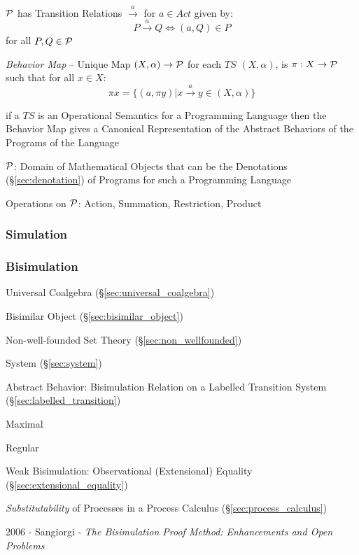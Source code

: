 $\mathcal{P}$ has Transition Relations $\xrightarrow{a}$ for $a \in Act$
given by:
\[
  P \xrightarrow{a} Q \Leftrightarrow (a,Q) \in P
\]
for all $P,Q \in \mathcal{P}$

\emph{Behavior Map} -- Unique Map $(X,\alpha) \rightarrow \mathcal{P}$
for each $TS$ $(X,\alpha)$, is $\pi : X \rightarrow \mathcal{P}$ such
that for all $x \in X$:
\[
  \pi x = \{(a,\pi y) | x \xrightarrow{a} y \in (X,\alpha)\}
\]

if a $TS$ is an Operational Semantics for a Programming Language then
the Behavior Map gives a Canonical Representation of the Abstract
Behaviors of the Programs of the Language

$\mathcal{P}$: Domain of Mathematical Objects that can be the
Denotations (\S\ref{sec:denotation}) of Programs for such a
Programming Language

Operations on $\mathcal{P}$: Action, Summation, Restriction, Product



\subsubsection{Simulation} \label{sec:simulation}

\subsubsection{Bisimulation} \label{sec:bisimulation}

Universal Coalgebra (\S\ref{sec:universal_coalgebra})

Bisimilar Object (\S\ref{sec:bisimilar_object})

Non-well-founded Set Theory (\S\ref{sec:non_wellfounded})

System (\S\ref{sec:system})

Abstract Behavior: Bisimulation Relation on a Labelled Transition
System (\S\ref{sec:labelled_transition}) \cite{aczel88}

Maximal

Regular

Weak Bisimulation: Observational (Extensional) Equality
(\S\ref{sec:extensional_equality})

\emph{Substitutability} of Processes in a Process Calculus
(\S\ref{sec:process_calculus})

2006 - Sangiorgi - \emph{The Bisimulation Proof Method: Enhancements and Open
  Problems}



